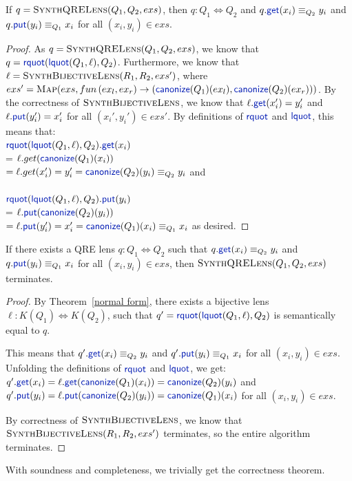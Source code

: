 \documentclass[acmsmall,screen]{acmart}
\newcommand{\kw}[1]{\textcolor{dkblue}{\ensuremath{\mathsf{#1}}}}
\newcommand{\canonize}{\ensuremath{\kw{canonize}}}
\newcommand{\get}{\ensuremath{\kw{get}}}
\newcommand{\lput}{\ensuremath{\kw{put}}}
\newcommand{\lquot}{\ensuremath{\kw{lquot}}}
\newcommand{\rquot}{\ensuremath{\kw{rquot}}}
\begin{document}
\begin{lemma}
  If $q = \textproc{SynthQRELens}(Q_1,Q_2,exs)$, then $q : Q_1 \Leftrightarrow
  Q_2$ and $q.\get(x_i) \equiv_{Q_2} y_i$  and 
$q.\lput(y_i) \equiv_{Q_1} x_i$ for all $(x_i,y_i)\in exs$.
\end{lemma}
\begin{proof}
  As $q = \textproc{SynthQRELens}(Q_1,Q_2,exs)$, we know that $q =
  \rquot(\lquot(Q_1, \ell), Q_2)$. Furthermore, we know that $\ell =
  \Call{SynthBijectiveLens}{R_1,R_2,exs'}$, where $exs' = \Call{Map}{exs,fun \,
    (ex_l,ex_r) \to (\canonize(Q_1)(ex_l),\canonize(Q_2)(ex_r))}$. By the
    correctness of $\textproc{SynthBijectiveLens}$, we know that
    $\ell.\get(x_i') = y_i'$ and $\ell.\lput(y_i') = x_i'$ for all
    $(x_i',y_i')\in exs'$. By definitions of $\rquot$ and $\lquot$, this means
    that:\\
$\rquot(\lquot(Q_1, \ell),
  Q_2).\get(x_i)$\\
 = $\ell.get(\canonize(Q_1)(x_i))$\\ $= \ell.get(x_i') = y_i' =
  \canonize(Q_2)(y_i) \equiv_{Q_2} y_i$ and\\
\\
$\rquot(\lquot(Q_1, \ell),
  Q_2).\lput(y_i)$\\
 = $\ell.\lput(\canonize(Q_2)(y_i))$\\ $= \ell.\lput(y_i') = x_i' =
  \canonize(Q_1)(x_i) \equiv_{Q_1} x_i$ as desired.
\end{proof}

\begin{lemma}
  If there exists a QRE lens $q : Q_1 \Leftrightarrow Q_2$ such that
  $q.\get(x_i) \equiv_{Q_2} y_i$ and $q.\lput(y_i) \equiv_{Q_1} x_i$ for all
  $(x_i,y_i)\in exs$, then $\textproc{SynthQRELens}(Q_1,Q_2,exs)$ terminates.
\end{lemma}
\begin{proof}
  By Theorem~\ref{normal form}, there exists a bijective lens $\ell : K(Q_1)
  \Leftrightarrow K(Q_2)$, such that $q' = \rquot(\lquot(Q_1, \ell), Q_2)$ is
  semantically equal to $q$.

  This means that $q'.\get(x_i) \equiv_{Q_2} y_i$ and $q'.\lput(y_i)
  \equiv_{Q_1} x_i$ for all $(x_i,y_i)\in exs$. Unfolding the definitions of
  $\rquot$ and $\lquot$, we get:\\
  $q'.\get(x_i) = \ell.\get(\canonize(Q_1)(x_i)) = \canonize(Q_2)(y_i)$ and\\
  $q'.\lput(y_i) = \ell.\lput(\canonize(Q_2)(y_i)) = \canonize(Q_1)(x_i)$ for all
  $(x_i,y_i)\in exs$.

  By correctness of $\textproc{SynthBijectiveLens}$, we know that
  $\Call{SynthBijectiveLens}{R_1,R_2,exs'}$ terminates, so the entire algorithm
  terminates. 
\end{proof}

With soundness and completeness, we trivially get the correctness theorem.


\end{document}
